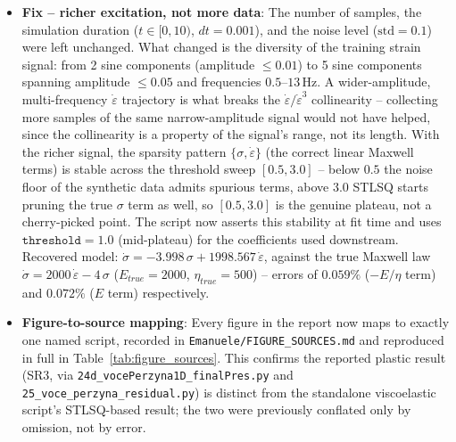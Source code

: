 \documentclass{article}
\begin{document}
\begin{itemize}
    \item \textbf{Fix -- richer excitation, not more data}: The number of samples, the simulation duration ($t\in[0,10)$, $dt=0.001$), and the noise level ($\text{std}=0.1$) were left unchanged. What changed is the diversity of the training strain signal: from 2 sine components (amplitude $\leq 0.01$) to 5 sine components spanning amplitude $\leq 0.05$ and frequencies $0.5$--$13\,\text{Hz}$. A wider-amplitude, multi-frequency $\dot{\varepsilon}$ trajectory is what breaks the $\dot{\varepsilon}/\dot{\varepsilon}^3$ collinearity -- collecting more samples of the same narrow-amplitude signal would not have helped, since the collinearity is a property of the signal's range, not its length. With the richer signal, the sparsity pattern $\{\sigma, \dot{\varepsilon}\}$ (the correct linear Maxwell terms) is stable across the threshold sweep $[0.5, 3.0]$ -- below $0.5$ the noise floor of the synthetic data admits spurious terms, above $3.0$ STLSQ starts pruning the true $\sigma$ term as well, so $[0.5, 3.0]$ is the genuine plateau, not a cherry-picked point. The script now asserts this stability at fit time and uses $\texttt{threshold}=1.0$ (mid-plateau) for the coefficients used downstream. Recovered model: $\dot{\sigma} = -3.998\,\sigma + 1998.567\,\dot{\varepsilon}$, against the true Maxwell law $\dot{\sigma} = 2000\,\dot{\varepsilon} - 4\,\sigma$ ($E_{true}=2000$, $\eta_{true}=500$) -- errors of $0.059\%$ ($-E/\eta$ term) and $0.072\%$ ($E$ term) respectively.
    \item \textbf{Figure-to-source mapping}: Every figure in the report now maps to exactly one named script, recorded in \texttt{Emanuele/FIGURE\_SOURCES.md} and reproduced in full in Table~\ref{tab:figure_sources}. This confirms the reported plastic result (SR3, via \texttt{24d\_vocePerzyna1D\_finalPres.py} and \texttt{25\_voce\_perzyna\_residual.py}) is distinct from the standalone viscoelastic script's STLSQ-based result; the two were previously conflated only by omission, not by error.
\end{itemize}
\end{document}

